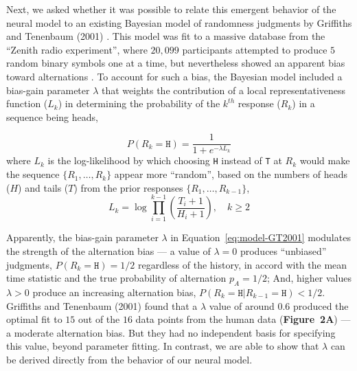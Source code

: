 \documentclass[11pt]{article}
\begin{document}
\vskip6pt

Next, we asked whether it was possible to relate this emergent behavior of the neural model to an existing Bayesian model of randomness judgments by Griffiths and Tenenbaum (2001) \cite{Griffiths2001}.
This model was fit to a massive database from the ``Zenith radio experiment'', where $20,\!099$ participants attempted to produce $5$ random binary symbols one at a time, but nevertheless showed an apparent bias toward alternations \cite{Goodfellow1938}.
To account for such a bias, the Bayesian model included a bias-gain parameter $\lambda$ that weights the contribution of a local representativeness function ($L_k$) in determining the probability of the $k^{th}$ response ($R_k$) in a sequence being heads,

\begin{equation}\label{eq:model-GT2001}   %
    P(R_k = \mathtt{H}) = \frac{1}{1+e^{-\lambda L_k}}
\end{equation}
where $L_k$ is the log-likelihood by which choosing \texttt{H} instead of \texttt{T} at $R_k$ would make the sequence $\{R_1, \ldots, R_k\}$ appear more ``random'', based on the numbers of heads ($H$) and tails ($T$) from the prior responses $\{R_1, \ldots, R_{k-1}\}$,
\begin{equation}\label{eq:log-likelihood-L} %
  L_k = \log \prod_{i=1}^{k-1} \left(\frac{T_i + 1}{H_i + 1} \right), \quad k \geq 2
\end{equation}

Apparently, the bias-gain parameter $\lambda$ in Equation~\ref{eq:model-GT2001} modulates the strength of the alternation bias ---
a value of $\lambda=0$ produces ``unbiased'' judgments,
$P(R_k = \mathtt{H}) = 1/2$ regardless of the history,
in accord with the mean time statistic and the true probability of alternation $p_A=1/2$;
And, higher values $\lambda>0$ produce an increasing alternation bias, $P(R_{k} = \mathtt{H} |R_{k-1} = \mathtt{H}) < 1/2$.
Griffiths and Tenenbaum (2001) found that a $\lambda$ value of around $0.6$ produced the optimal fit to $15$ out of the $16$ data points from the human data (\textbf{Figure~2A}) --- a moderate alternation bias.
But they had no independent basis for specifying this value, beyond parameter fitting.
In contrast, we are able to show that $\lambda$ can be derived directly from the behavior of our neural model.
\end{document}
